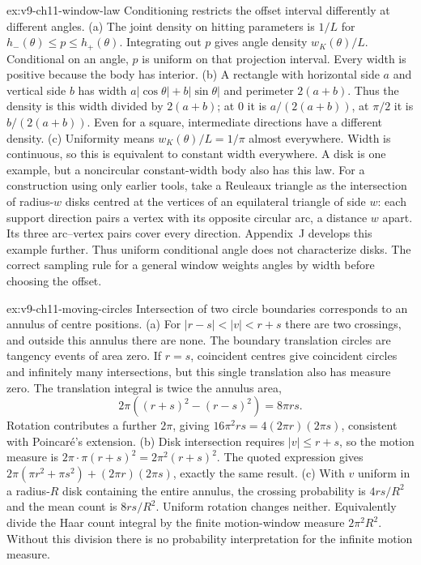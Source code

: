 \begin{solution}{ex:v9-ch11-window-law}
\idea Conditioning restricts the offset interval differently at different angles.
\writeup (a) The joint density on hitting parameters is $1/L$ for $h_-(\theta)\le p\le h_+(\theta)$. Integrating out $p$ gives angle density $w_K(\theta)/L$. Conditional on an angle, $p$ is uniform on that projection interval. Every width is positive because the body has interior.
(b) A rectangle with horizontal side $a$ and vertical side $b$ has width $a|\cos\theta|+b|\sin\theta|$ and perimeter $2(a+b)$. Thus the density is this width divided by $2(a+b)$; at $0$ it is $a/(2(a+b))$, at $\pi/2$ it is $b/(2(a+b))$. Even for a square, intermediate directions have a different density.
(c) Uniformity means $w_K(\theta)/L=1/\pi$ almost everywhere. Width is continuous, so this is equivalent to constant width everywhere. A disk is one example, but a noncircular constant-width body also has this law. For a construction using only earlier tools, take a Reuleaux triangle as the intersection of radius-$w$ disks centred at the vertices of an equilateral triangle of side $w$: each support direction pairs a vertex with its opposite circular arc, a distance $w$ apart. Its three arc--vertex pairs cover every direction. Appendix~J develops this example further. Thus uniform conditional angle does not characterize disks. The correct sampling rule for a general window weights angles by width before choosing the offset.
\end{solution}

\begin{solution}{ex:v9-ch11-moving-circles}
\idea Intersection of two circle boundaries corresponds to an annulus of centre positions.
\writeup (a) For $|r-s|<|v|<r+s$ there are two crossings, and outside this annulus there are none. The boundary translation circles are tangency events of area zero. If $r=s$, coincident centres give coincident circles and infinitely many intersections, but this single translation also has measure zero. The translation integral is twice the annulus area,
\[
2\pi((r+s)^2-(r-s)^2)=8\pi rs.
\]
Rotation contributes a further $2\pi$, giving $16\pi^2rs=4(2\pi r)(2\pi s)$, consistent with Poincaré's extension.
(b) Disk intersection requires $|v|\le r+s$, so the motion measure is $2\pi\cdot\pi(r+s)^2=2\pi^2(r+s)^2$. The quoted expression gives $2\pi(\pi r^2+\pi s^2)+(2\pi r)(2\pi s)$, exactly the same result.
(c) With $v$ uniform in a radius-$R$ disk containing the entire annulus, the crossing probability is $4rs/R^2$ and the mean count is $8rs/R^2$. Uniform rotation changes neither. Equivalently divide the Haar count integral by the finite motion-window measure $2\pi^2R^2$. Without this division there is no probability interpretation for the infinite motion measure.
\end{solution}

